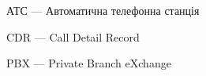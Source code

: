 \newpage
{}
\begin{ESKDexplanation}
  \item АТС --- Автоматична телефонна станція
  \item CDR --- Call Detail Record
  \item PBX --- Private Branch eXchange
\end{ESKDexplanation}
